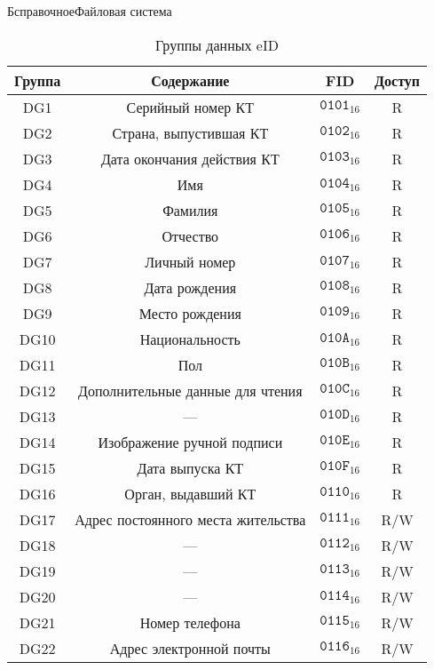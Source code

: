 \begin{appendix}{Б}{справочное}{Файловая система}
\begin{table}[H]
\caption{Группы данных eID}
\label{Table.FILES.DG}
\begin{tabular}{|c|c|c|c|}
\hline
Группа & Содержание & FID & Доступ\\
\hline
\hline
DG1 & Серийный номер КТ & 
$\texttt{0101}_{16}$ & R\\
DG2 & Страна, выпустившая КТ & 
$\texttt{0102}_{16}$ & R\\
DG3 & Дата окончания действия КТ & 
$\texttt{0103}_{16}$ & R\\
DG4 & Имя & 
$\texttt{0104}_{16}$ & R\\
DG5 & Фамилия & 
$\texttt{0105}_{16}$ & R\\
DG6 & Отчество & 
$\texttt{0106}_{16}$ & R\\
DG7 & Личный номер & 
$\texttt{0107}_{16}$ & R\\
DG8 & Дата рождения & 
$\texttt{0108}_{16}$ & R\\
DG9 & Место рождения & 
$\texttt{0109}_{16}$ & R\\
DG10 & Национальность & 
$\texttt{010A}_{16}$ & R\\
DG11 & Пол & 
$\texttt{010B}_{16}$ & R\\
DG12 & Дополнительные данные для чтения & 
$\texttt{010C}_{16}$ & R\\
DG13 & 
--- &
$\texttt{010D}_{16}$ & R\\
DG14 & Изображение ручной подписи & 
$\texttt{010E}_{16}$ & R\\
DG15 & Дата выпуска КТ & 
$\texttt{010F}_{16}$ & R\\
DG16 & Орган, выдавший КТ &  
$\texttt{0110}_{16}$ & R\\
DG17 & 	Адрес постоянного места жительства & 
$\texttt{0111}_{16}$ & R/W\\
DG18 & 	
--- &
$\texttt{0112}_{16}$ & R/W\\
DG19 & 	
--- &
$\texttt{0113}_{16}$ & R/W\\
DG20 & 	
--- &
$\texttt{0114}_{16}$ & R/W\\
DG21 & 	Номер телефона & 
$\texttt{0115}_{16}$ & R/W\\
DG22 & 	Адрес электронной почты & 
$\texttt{0116}_{16}$ & R/W\\
\hline
\end{tabular}
\end{table}



\end{appendix}
